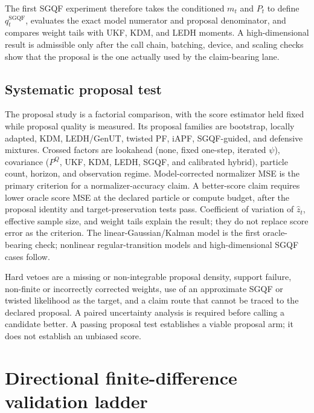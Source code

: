 \documentclass[11pt]{article}
\begin{document}
The first SGQF experiment therefore takes the conditioned $m_t$ and $P_t$ to define
$q_t^{\mathrm{SGQF}}$, evaluates the exact model numerator and proposal
denominator, and compares weight tails with UKF, KDM, and LEDH moments. A
high-dimensional result is admissible only after the call chain, batching,
device, and scaling checks show that the proposal is the one actually used by
the claim-bearing lane.

\subsection{Systematic proposal test}

The proposal study is a factorial comparison, with the score estimator held
fixed while proposal quality is measured. Its proposal families are bootstrap,
locally adapted, KDM, LEDH/GenUT, twisted PF, iAPF, SGQF-guided, and defensive
mixtures. Crossed factors are lookahead (none, fixed one-step, iterated $\psi$),
covariance ($P^Q$, UKF, KDM, LEDH, SGQF, and calibrated hybrid), particle count,
horizon, and observation regime. Model-corrected normalizer MSE is the primary
criterion for a normalizer-accuracy claim. A better-score claim requires lower
oracle score MSE at the declared particle or compute budget, after the proposal
identity and target-preservation tests pass. Coefficient of variation of
$\widehat z_t$, effective sample size, and weight tails explain the result;
they do not replace score error as the criterion.
The linear-Gaussian/Kalman model is the first oracle-bearing check; nonlinear
regular-transition models and high-dimensional SGQF cases follow.

Hard vetoes are a missing or non-integrable proposal density, support failure,
non-finite or incorrectly corrected weights, use of an approximate SGQF or
twisted likelihood as the target, and a claim route that cannot be traced to the
declared proposal. A paired uncertainty analysis is required before calling a
candidate better. A passing proposal test establishes a viable proposal arm;
it does not establish an unbiased score.

\section{Directional finite-difference validation ladder}
\label{sec:fd-ladder}
\end{document}
